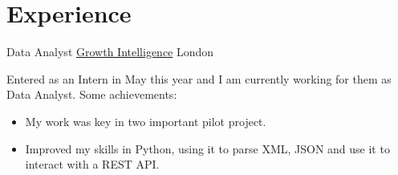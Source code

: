\documentclass[11pt,a4paper,roman]{moderncv}
\begin{document}







\section{Experience}

	{Data Analyst}
	{\href{http://growthintel.com/}{Growth Intelligence}}
	{London}
	{}
	{Entered as an Intern in May this year and I am currently working for them as Data
	 Analyst. Some achievements:
	\begin{itemize}
		\item My work was key in two important pilot project.
		\item Improved my skills in Python, using it to parse XML, JSON and use it to 
		interact with a REST API.
	\end{itemize}}
\end{document}
